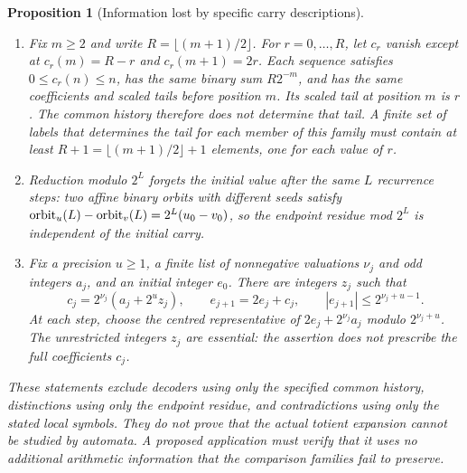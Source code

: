 \documentclass[11pt]{article}
\theoremstyle{plain}
\newtheorem{prop}[thm]{Proposition}
\theoremstyle{definition}
\theoremstyle{remark}
\let\origmathrm\mathrm
\renewcommand{\mathrm}[1]{\ifmmode\origmathrm{#1}\else\textrm{#1}\fi}%
\begin{document}
\begin{prop}[Information lost by specific carry descriptions]
\label{prop:b5}
\begin{enumerate}[label=(\roman*),leftmargin=*]
\item Fix $m\ge2$ and write $R=\lfloor(m+1)/2\rfloor$. For
  $r=0,\ldots,R$, let $c_r$ vanish except at
  $c_r(m)=R-r$ and $c_r(m+1)=2r$. Each sequence satisfies
  $0\le c_r(n)\le n$, has the same binary sum $R2^{-m}$, and has
  the same coefficients and scaled tails before position $m$.
  Its scaled tail at position $m$ is $r$. The common history therefore
  does not determine that tail. A finite set of labels that determines
  the tail for each member of this family must contain at least
  $R+1=\lfloor(m+1)/2\rfloor+1$ elements, one for each value of $r$.
\item Reduction modulo $2^L$ forgets the initial value after the same
$L$ recurrence steps: two
  affine binary orbits with different seeds satisfy
  $\mathrm{orbit}_u(L) - \mathrm{orbit}_v(L) = 2^{L}(u_0 - v_0)$, so the
  endpoint residue mod $2^{L}$ is independent of the initial carry.
\item Fix a precision $u\ge1$, a finite list of nonnegative valuations
  $\nu_j$ and odd integers $a_j$, and an initial integer $e_0$.
  There are integers $z_j$ such that
  \[
   c_j=2^{\nu_j}(a_j+2^u z_j),\qquad
   e_{j+1}=2e_j+c_j,\qquad |e_{j+1}|\le2^{\nu_j+u-1}.
  \]
  At each step, choose the centred representative of
  $2e_j+2^{\nu_j}a_j$ modulo $2^{\nu_j+u}$.
  The unrestricted integers $z_j$ are essential: the assertion does not
  prescribe the full coefficients $c_j$.
\end{enumerate}
These statements exclude decoders using only the specified common
history, distinctions using only the endpoint residue, and contradictions
using only the stated local symbols. They do not prove that the actual
totient expansion cannot be studied by automata. A proposed application
must verify that it uses no additional arithmetic information that the
comparison families fail to preserve.
\end{prop}
\end{document}
